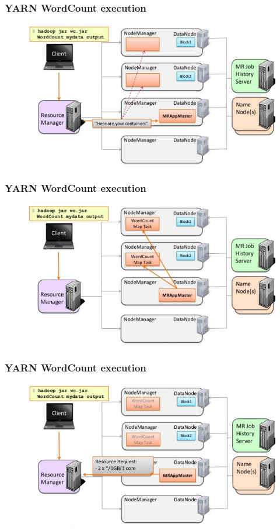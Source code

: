 \begin{frame}
\frametitle{YARN WordCount execution}
\begin{figure}[h]
  \centering
  \includegraphics[scale=0.4]{./figures/yarn_wc5}
  \label{fig:yarn_wc5}
\end{figure}
\end{frame}

\begin{frame}
\frametitle{YARN WordCount execution}
\begin{figure}[h]
  \centering
  \includegraphics[scale=0.4]{./figures/yarn_wc6}
  \label{fig:yarn_wc6}
\end{figure}
\end{frame}

\begin{frame}
\frametitle{YARN WordCount execution}
\begin{figure}[h]
  \centering
  \includegraphics[scale=0.4]{./figures/yarn_wc7}
  \label{fig:yarn_wc7}
\end{figure}
\end{frame}


